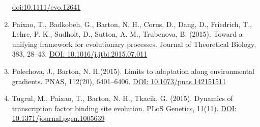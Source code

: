 \documentclass[10pt]{article}
\begin{document}
\begin{cv}
\begin{enumerate}
\href{http://dx.doi.org/10.1111/evo.12641 }{doi:10.1111/evo.12641}
\item Paixao, T., Badkobeh, G., Barton, N. H., Corus, D., Dang, D., Friedrich, T., Lehre, P. K., Sudholt, D., Sutton, A. M., Trubenova, B. (2015). Toward a unifying framework for evolutionary processes. Journal of Theoretical Biology, 383, 28–43.
\href{https://research-explorer.app.ist.ac.at/record/1542}{DOI: 10.1016/j.jtbi.2015.07.011}
\item Polechova, J., Barton, N. H.(2015). Limits to adaptation along environmental gradients. PNAS, 112(20), 6401–6406.
\href{https://research-explorer.app.ist.ac.at/record/1818}{DOI: 10.1073/pnas.142151511}
\item Tugrul, M., Paixao, T., Barton, N. H., Tkacik, G. (2015). Dynamics of transcription factor binding site evolution. PLoS Genetics, 11(11).
\href{https://doi.org/10.1371/journal.pgen.1005639}{DOI: 10.1371/journal.pgen.1005639}


\end{enumerate}






\setlength{\oldcvlabelwidth}{\cvlabelwidth}
\setlength{\cvlabelwidth}{6em}





\setlength{\cvlabelwidth}{\oldcvlabelwidth}



\end{cv}
\end{document}
